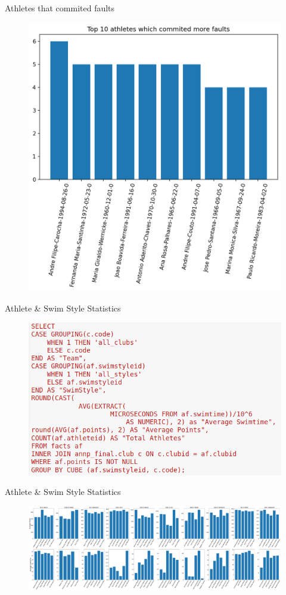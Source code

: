 \documentclass[aspectratio=169, xcolor=dvipsnames]{beamer}
\begin{document}
\begin{frame}{Athletes that commited faults}
    \begin{figure}
        \centering
        \includegraphics[width=.45\textwidth]{img/faults.png}
    \end{figure}
\end{frame}

\begin{frame}[allowframebreaks]{Athlete \& Swim Style Statistics}
    \begin{figure}
        \centering
        \includegraphics[width=.55\textwidth]{img/query.png}
    \end{figure}
\end{frame}

\begin{frame}[allowframebreaks]{Athlete \& Swim Style Statistics}
    \begin{figure}
        \centering
        \includegraphics[width=\textwidth]{img/stats_athlete_swim.pdf}
    \end{figure}
\end{frame}
\end{document}
